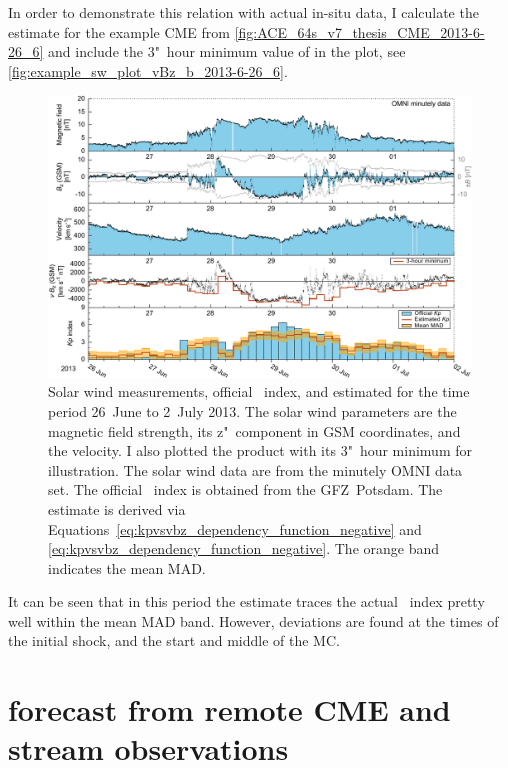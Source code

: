 In order to demonstrate this relation with actual in-situ data, I calculate the \Kp{} estimate for the example CME from \autoref{fig:ACE_64s_v7_thesis_CME_2013-6-26_6} and include the 3"~hour minimum value of \vBz{} in the plot, see \autoref{fig:example_sw_plot_vBz_b_2013-6-26_6}.
\begin{figure}[htb]
	\centering
	\includegraphics[width=\textwidth]{figures_of_mine/chapter2/example_sw_plot_vBz_b_2013-6-26_6.pdf}
	\caption[]
	{Solar wind measurements, official \Kp{}~index, and estimated \Kp{} for the time period 26~June to 2~July 2013. The solar wind parameters are the magnetic field strength, its z"~component in GSM coordinates, and the velocity. I also plotted the product \vBz{} with its 3"~hour minimum for illustration. The solar wind data are from the minutely OMNI data set. The official \Kp{}~index is obtained from the GFZ~Potsdam. The \Kp{} estimate is derived via Equations~\ref{eq:kpvsvbz_dependency_function_negative} and \ref{eq:kpvsvbz_dependency_function_negative}. The orange band indicates the mean MAD.}
	\label{fig:example_sw_plot_vBz_b_2013-6-26_6}
\end{figure}
It can be seen that in this period the \Kp{} estimate traces the actual \Kp{}~index pretty well within the mean MAD band. However, deviations are found at the times of the initial shock, and the start and middle of the MC.\\



\section{\Kp{} forecast from remote CME and stream observations}
\label{sec:kp_forecast}

